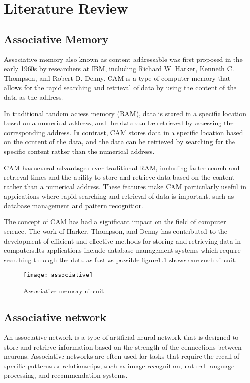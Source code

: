 \chapter{Literature Review}

\section{Associative Memory}
Associative memory also known as content addressable was first proposed in the
early 1960s by researchers at IBM, including Richard W. Harker, Kenneth C.
Thompson, and Robert D. Denny. CAM is a type of computer memory that allows for
the rapid searching and retrieval of data by using the content of the data as
the address.

In traditional random access memory (RAM), data is stored in a specific
location based on a numerical address, and the data can be retrieved by
accessing the corresponding address. In contrast, CAM stores data in a specific
location based on the content of the data, and the data can be retrieved by
searching for the specific content rather than the numerical address.

CAM has several advantages over traditional RAM, including faster search and
retrieval times and the ability to store and retrieve data based on the content
rather than a numerical address. These features make CAM particularly useful in
applications where rapid searching and retrieval of data is important, such as
database management and pattern recognition.

The concept of CAM has had a significant impact on the field of computer
science. The work of Harker, Thompson, and Denny has contributed to the
development of efficient and effective methods for storing and retrieving data
in computers.Its applications include database management systems which require
searching through the data as fast as possible figure\ref{associative_circuit}
shows one such circuit.
\begin{figure}[h!]
    \centering
    \texttt{[image: associative]}
    \caption{Associative memory circuit}\label{associative_circuit}
\end{figure}

\section{Associative network}
An associative network is a type of artificial neural network that is designed
to store and retrieve information based on the strength of the connections
between neurons. Associative networks are often used for tasks that require the
recall of specific patterns or relationships, such as image recognition,
natural language processing, and recommendation systems.
